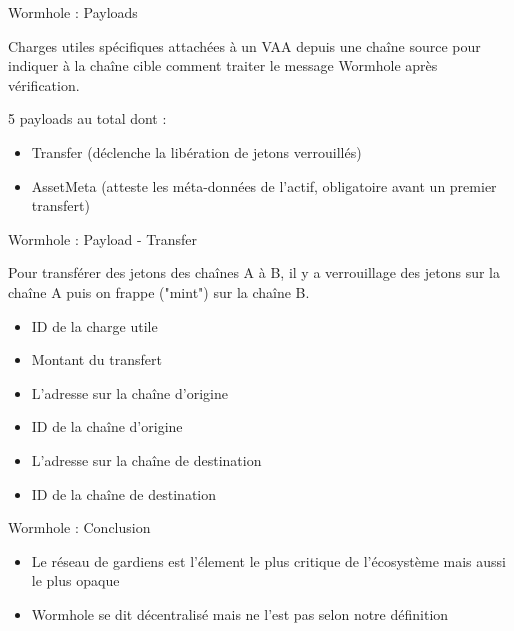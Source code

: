 \begin{frame}{Wormhole : Payloads}

Charges utiles spécifiques attachées à un VAA depuis une chaîne source pour indiquer à la chaîne cible comment traiter le message Wormhole après vérification.\newline

5 payloads au total dont :
\begin{itemize}
    \item Transfer (déclenche la libération de jetons verrouillés) 
    \item AssetMeta (atteste les méta-données de l'actif, obligatoire avant un premier transfert)
\end{itemize}
\end{frame}

\begin{frame}{Wormhole : Payload - Transfer}

Pour transférer des jetons des chaînes A à B, il y a verrouillage des jetons sur la chaîne A puis on frappe ("mint") sur la chaîne B.\newline

\begin{itemize}
    \item ID de la charge utile
    \item Montant du transfert
    \item L'adresse sur la chaîne d'origine 
    \item ID de la chaîne d'origine
    \item L'adresse sur la chaîne de destination
    \item ID de la chaîne de destination
\end{itemize} 
\end{frame}

\begin{frame}{Wormhole : Conclusion}

\begin{itemize}
    \item Le réseau de gardiens est l'élement le plus critique de l'écosystème mais aussi le plus opaque
    \item Wormhole se dit décentralisé mais ne l'est pas selon notre définition
\end{itemize}
\end{frame}